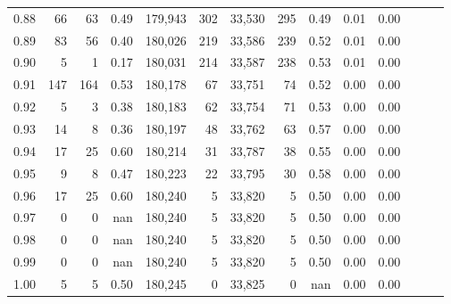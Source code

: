 \begin{tabular}{rrrrrrrrrrrrrr}
0.88 &      66 &     63 &  0.49 &  179,943 &      302 &  33,530 &     295 &  0.49 &  0.01 &      0.00 \\
0.89 &      83 &     56 &  0.40 &  180,026 &      219 &  33,586 &     239 &  0.52 &  0.01 &      0.00 \\
0.90 &       5 &      1 &  0.17 &  180,031 &      214 &  33,587 &     238 &  0.53 &  0.01 &      0.00 \\
0.91 &     147 &    164 &  0.53 &  180,178 &       67 &  33,751 &      74 &  0.52 &  0.00 &      0.00 \\
0.92 &       5 &      3 &  0.38 &  180,183 &       62 &  33,754 &      71 &  0.53 &  0.00 &      0.00 \\
0.93 &      14 &      8 &  0.36 &  180,197 &       48 &  33,762 &      63 &  0.57 &  0.00 &      0.00 \\
0.94 &      17 &     25 &  0.60 &  180,214 &       31 &  33,787 &      38 &  0.55 &  0.00 &      0.00 \\
0.95 &       9 &      8 &  0.47 &  180,223 &       22 &  33,795 &      30 &  0.58 &  0.00 &      0.00 \\
0.96 &      17 &     25 &  0.60 &  180,240 &        5 &  33,820 &       5 &  0.50 &  0.00 &      0.00 \\
0.97 &       0 &      0 &   nan &  180,240 &        5 &  33,820 &       5 &  0.50 &  0.00 &      0.00 \\
0.98 &       0 &      0 &   nan &  180,240 &        5 &  33,820 &       5 &  0.50 &  0.00 &      0.00 \\
0.99 &       0 &      0 &   nan &  180,240 &        5 &  33,820 &       5 &  0.50 &  0.00 &      0.00 \\
1.00 &       5 &      5 &  0.50 &  180,245 &        0 &  33,825 &       0 &   nan &  0.00 &      0.00 \\
\bottomrule
\end{tabular}
